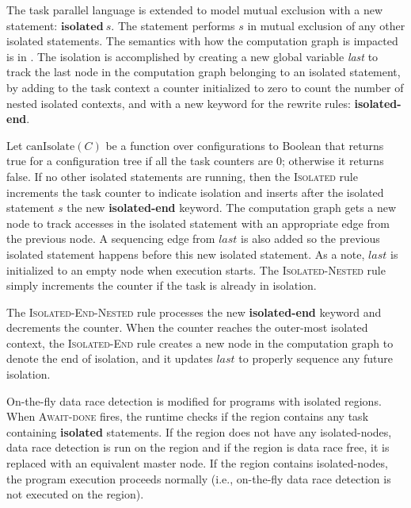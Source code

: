 The task parallel language is extended to model mutual exclusion with a new statement: $\textbf{isolated}~s$. The statement performs $s$ in mutual exclusion of any other isolated statements. The semantics with how the computation graph is impacted is in . The isolation is accomplished by creating a new global variable \textit{last} to track the last node in the computation graph belonging to an isolated statement, by adding to the task context a counter initialized to zero to count the number of nested isolated contexts, and with a new keyword for the rewrite rules: \textbf{isolated-end}. 

Let $\mathrm{canIsolate}(C)$ be a function over configurations to Boolean that returns true for a configuration tree if all the task counters are 0; otherwise it returns false. If no other isolated statements are running, then the \textsc{Isolated} rule increments the task counter to indicate isolation and inserts after the isolated statement $\mathit{s}$ the new \textbf{isolated-end} keyword. The computation graph gets a new node to track accesses in the isolated statement with an appropriate edge from the previous node. A sequencing edge from $\mathit{last}$ is also added so the previous isolated statement happens before this new isolated statement. As a note, $\mathit{last}$ is initialized to an empty node when execution starts. The \textsc{Isolated-Nested} rule simply increments the counter if the task is already in isolation.

The \textsc{Isolated-End-Nested} rule processes the new \textbf{isolated-end} keyword and decrements the counter. When the counter reaches the outer-most isolated context, the \textsc{Isolated-End} rule creates a new node in the computation graph to denote the end of isolation, and it updates $\mathit{last}$ to properly sequence any future isolation.

On-the-fly data race detection is modified for programs with isolated regions. When \textsc{Await-done} fires, the runtime checks if the region contains any task containing \textbf{isolated} statements. If the region does not have any isolated-nodes, data race detection is run on the region and if the region is data race free, it is replaced with an equivalent master node. If the region contains isolated-nodes, the program execution proceeds normally (i.e., on-the-fly data race detection is not executed on the region).

